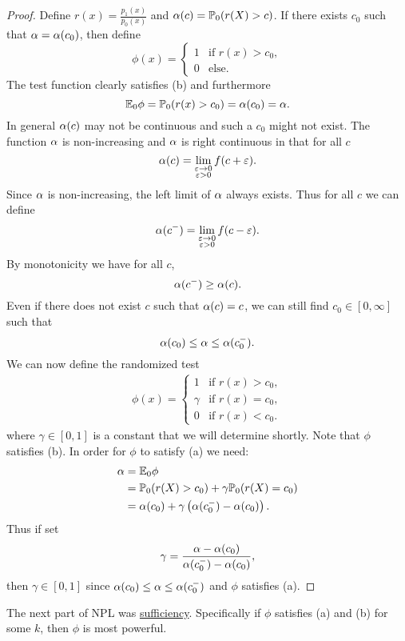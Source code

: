\begin{proof}
    Define $r(x) = \frac{p_1(x)}{p_0(x)}$ and ${\alpha}(c) = {\mathbb{P}}_0(r(X)>c)$. If there exists $c_0$ such that ${\alpha} = {\alpha}(c_0)$, then define 
    \[\phi(x) = \begin{cases}
        1 &\text{if } r(x) > c_0,\\
        0 & \text{else}.
    \end{cases} \]
    The test function clearly satisfies (b) and furthermore 
    \[{\mathbb{E}}_0 \phi = {\mathbb{P}}_0(r(x)>c_0)={\alpha}(c_0)={\alpha}. \]
    In general ${\alpha}(c)$ may not be continuous and such a $c_0$ might not exist. The function ${\alpha}$ is non-increasing and ${\alpha}$ is right continuous in that for all $c$ 
    \[{\alpha}(c) = \lim_{\substack{\varepsilon \to 0\\ \varepsilon > 0}}f(c+\varepsilon).\]
    Since ${\alpha}$ is non-increasing, the left limit of ${\alpha}$ always exists. Thus for all $c$ we can define 
    \[{\alpha}(c^-) = \lim_{\substack{\varepsilon \to 0\\ \varepsilon > 0}}f(c-\varepsilon). \]
    By monotonicity we have for all $c$,
    \[{\alpha}(c^-) \ge {\alpha}(c). \]
    Even if there does not exist $c$ such that ${\alpha}(c)=c$, we can still find $c_0 \in [0,\infty]$ such that 
    \[{\alpha}(c_0) \le {\alpha} \le {\alpha}(c_0^-). \]
    We can now define the randomized test 
    \begin{align*}
        \phi(x) = \begin{cases}
            1 & \text{if } r(x) > c_0,\\
            \gamma & \text{if } r(x)=c_0,\\
            0 & \text{if } r(x) < c_0.
        \end{cases}
    \end{align*}
    where $\gamma \in [0,1]$ is a constant that we will determine shortly. Note that $\phi$ satisfies (b). In order for $\phi$ to satisfy (a) we need:
    \begin{align*}
        {\alpha} &= {\mathbb{E}}_0 \phi \\
        &= {\mathbb{P}}_0(r(X) > c_0)+\gamma {\mathbb{P}}_0(r(X) = c_0)\\
        &= {\alpha}(c_0) +\gamma\left({\alpha}(c_0^-)-{\alpha}(c_0)\right).
    \end{align*}
    Thus if set 
    \[\gamma = \frac{{\alpha}-{\alpha}(c_0)}{{\alpha}(c_0^-)-{\alpha}(c_0)}, \]
    then $\gamma \in [0,1]$ since ${\alpha}(c_0) \le {\alpha} \le {\alpha}(c_0^-)$ and $\phi$ satisfies (a).
\end{proof}
The next part of NPL was \underline{sufficiency}. Specifically if $\phi$ satisfies (a) and (b) for some $k$, then $\phi$ is most powerful.
